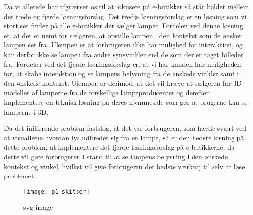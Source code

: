 Da vi allerede har afgrænset os til at fokusere på e-butikker så står baldet mellem det trede og fjerde løsningsforslag. Det tredje løsningsforslag er en løsning som vi stort set finder på alle e-butikker der sælger lamper. Fordelen ved denne løsning er, at det er nemt for sælgeren, at opstille lampen i den kontekst som de ønsker lampen set fra. Ulempen er at forbrugeren ikke har mulighed for interaktion, og kan derfor ikke se lampen fra andre synsvinkler end de som der er taget billeder fra. Fordelen ved det fjerde løsningsforslag er, at vi har kunden har muligheden for, at skabe interaktion og se lampens belysning fra de ønskede vinkler samt i den ønskede kontekst. Ulempen er derimod, at det vil kræve at sælgeren får 3D-modeller af lamperne fra de forskellige lampeproducenter og derefter implementere en teknisk løsning på deres hjemmeside som gør at brugerne kan se lamperne i 3D. 


Da det initierende problem fastslog, at det var forbrugeren, som havde svært ved at visualisere hvordan lys udbreder sig fra en lampe, så er den bedste løsning på dette problem, at implementere det fjerde løsningsforslag på e-butikkerne, da dette vil gøre forbrugeren i stand til at se lampens belysning i den ønskede kontekst og vinkel, hvilket vil give forbrugeren det bedste værktøj til selv at løse problemet.

\begin{figure}[H]
  \centering
  \texttt{[image: p1\_skitser]}
  \caption{svg image}
\end{figure}